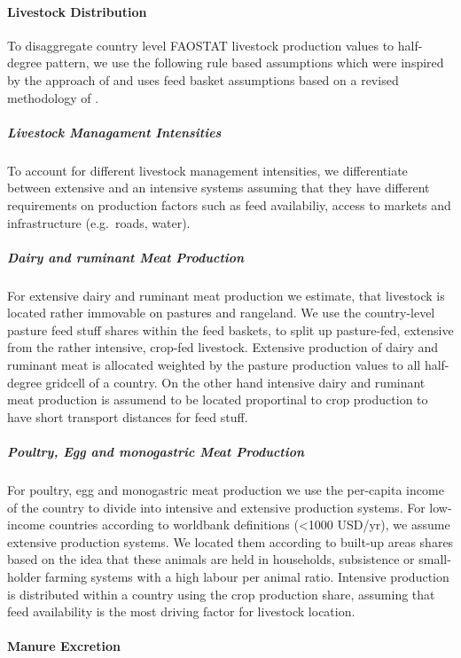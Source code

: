 \documentclass[gc, manuscript]{copernicus}
\begin{document}
\paragraph{Livestock Distribution}

To disaggregate country level FAOSTAT livestock production values to
half-degree pattern, we use the following rule based assumptions which
were inspired by the approach of \citep{gilbert} and uses feed basket
assumptions based on a revised methodology of \citet{weindl}.

\subparagraph{Livestock Managament Intensities}

To account for different livestock management intensities, we
differentiate between extensive and an intensive systems assuming that
they have different requirements on production factors such as feed
availabiliy, access to markets and infrastructure (e.g.~roads, water).

\subparagraph{Dairy and ruminant Meat Production}

For extensive dairy and ruminant meat production we estimate, that
livestock is located rather immovable on pastures and rangeland. We use
the country-level pasture feed stuff shares within the feed baskets, to
split up pasture-fed, extensive from the rather intensive, crop-fed
livestock. Extensive production of dairy and ruminant meat is allocated
weighted by the pasture production values to all half-degree gridcell of
a country. On the other hand intensive dairy and ruminant meat
production is assumend to be located proportinal to crop production to
have short transport distances for feed stuff.

\subparagraph{Poultry, Egg and monogastric Meat Production}

For poultry, egg and monogastric meat production we use the per-capita
income of the country to divide into intensive and extensive production
systems. For low-income countries according to worldbank definitions
(\textless1000 USD/yr), we assume extensive production systems. We
located them according to built-up areas shares based on the idea that
these animals are held in households, subsistence or small-holder
farming systems with a high labour per animal ratio. Intensive
production is distributed within a country using the crop production
share, assuming that feed availability is the most driving factor for
livestock location.

\paragraph{Manure Excretion}
\end{document}
